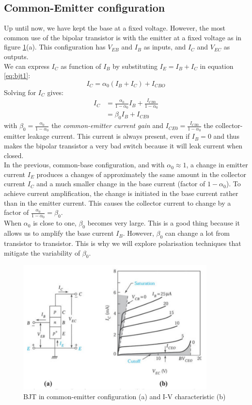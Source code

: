 \subsection{Common-Emitter configuration}
Up until now, we have kept the base at a fixed voltage. However, the most common use of the bipolar transistor is with the emitter at a fixed voltage as in figure \ref{fig:bjt6}(a). This configuration has $V_{EB}$ and $I_B$ as inputs, and $I_C$ and $V_{EC}$ as outputs.\\
We can express $I_C$ as function of $I_{B}$ by substituting $I_E = I_B + I_C$ in equation \ref{eq:bjt1}:
$$
I_C = \alpha_0 (I_B + I_C) + I_{CBO}
$$
Solving for $I_C$ gives:
\begin{equation}
    \begin{split}
        I_C &= \frac{\alpha_0}{1-\alpha_0} I_B + \frac{I_{CB0}}{1 - \alpha_0}\\
            &= \beta_0 I_B + I_{CE0}
        \label{eq:bjt2}
    \end{split}
\end{equation}
with $\beta_0 = \frac{\alpha_0}{1-\alpha_0}$ the \emph{common-emitter current gain} and $I_{CE0} = \frac{I_{CB0}}{1-\alpha_0}$ the collector-emitter leakage current. This current is always present, even if $I_B=0$ and thus makes the bipolar transistor a very bad switch because it will leak current when closed.\\
In the previous, common-base configuration, and with $\alpha_0 \approx 1$, a change in emitter current $I_E$ produces a changes of approximately the same amount in the collector current $I_C$ and a much smaller change in the base current (factor of $1-\alpha_0$). To achieve current amplification, the change is initiated in the base current rather than in the emitter current. This causes the collector current to change by a factor of $\frac{\alpha_0}{1 - \alpha_0} = \beta_0$.\\
When $\alpha_0$ is close to one, $\beta_0$ becomes very large. This is a good thing because it allows us to amplify the base current $I_B$. However, $\beta_0$ can change a lot from transistor to transistor. This is why we will explore polarisation techniques that mitigate the variability of $\beta_0$.


\begin{figure}[h!]
\centering
\includegraphics[width=10cm]{figures/ch01/bjt6.jpg}
\caption{BJT in common-emitter configuration (a) and I-V characteristic (b)} 
\label{fig:bjt6}
\end{figure}

